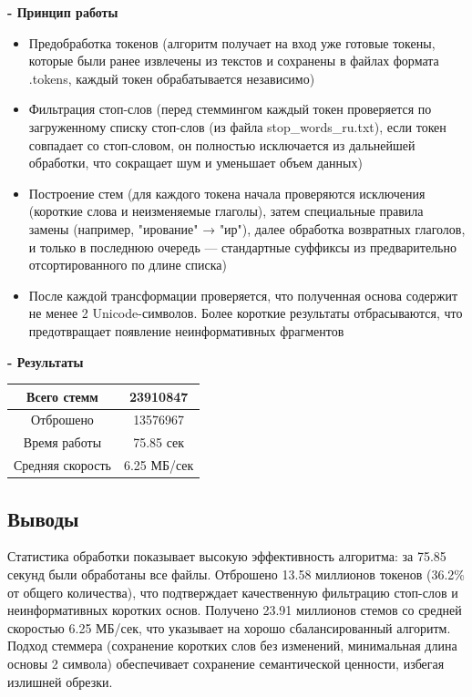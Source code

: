 \documentclass[pdf, unicode, 12pt, a4paper, oneside, fleqn]{article}
\begin{document}
\textbf{- Принцип работы} 
\begin{itemize}
\item Предобработка токенов (алгоритм получает на вход уже готовые токены, которые были ранее извлечены из текстов и сохранены в файлах 
формата .tokens, каждый токен обрабатывается независимо) 
\item Фильтрация стоп-слов (перед стеммингом каждый токен проверяется по загруженному списку стоп-слов (из файла stop\_words\_ru.txt), если токен совпадает со стоп-словом, он полностью исключается из дальнейшей 
обработки, что сокращает шум и уменьшает объем данных)
\item Построение стем (для каждого токена начала проверяются исключения 
(короткие слова и неизменяемые глаголы), затем специальные правила 
замены (например, "ирование" → "ир"), далее обработка возвратных 
глаголов, и только в последнюю очередь — стандартные суффиксы из 
предварительно отсортированного по длине списка) 
\item После каждой трансформации проверяется, что полученная основа 
содержит не менее 2 Unicode-символов. Более короткие результаты 
отбрасываются, что предотвращает появление неинформативных 
фрагментов 
\end{itemize}

\textbf{- Результаты} 

\begin{center}
\begin{tabular}{ |c|c| }
\hline
 Всего стемм & 23910847 \\  
 \hline
 Отброшено & 13576967 \\ 
 \hline
 Время работы & 75.85 сек \\
 \hline
 Средняя скорость & 6.25 МБ/сек \\
 \hline
\end{tabular}
\end{center} 

\subsection*{Выводы}
Статистика обработки показывает высокую эффективность 
алгоритма: за 75.85 секунд были обработаны все файлы. Отброшено 13.58 миллионов токенов (36.2\% от общего количества), что подтверждает качественную фильтрацию стоп-слов и неинформативных коротких основ. Получено 23.91 миллионов стемов со средней скоростью 6.25 МБ/сек, что указывает на хорошо сбалансированный алгоритм. Подход стеммера (сохранение коротких слов без изменений, минимальная длина основы 2 символа) обеспечивает сохранение семантической ценности, избегая излишней обрезки. 
\end{document}
